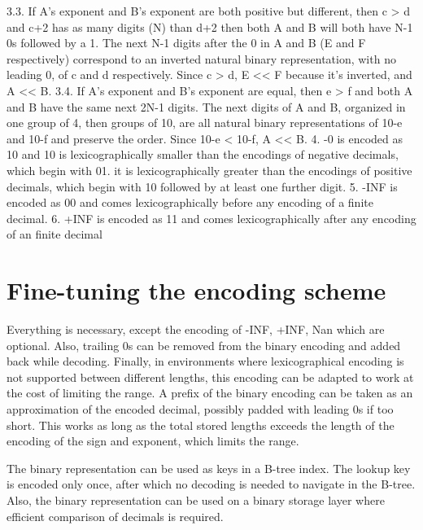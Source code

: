 \documentclass{acm_proc_article-sp}
\begin{document}
  3.3. If A's exponent and B's exponent are both positive but different, then c > d and c+2 has as many digits (N) than d+2 then both A and B will both have N-1 0s followed by a 1. The next N-1 digits after the 0 in A and B (E and F respectively) correspond to an inverted natural binary representation, with no leading 0, of c and d respectively. Since c > d, E << F because it's inverted, and A << B.
  3.4. If A's exponent and B's exponent are equal, then e > f and both A and B have the same next 2N-1 digits. The next digits of A and B, organized in one group of 4, then groups of 10, are all natural binary representations of 10-e and 10-f and preserve the order. Since 10-e < 10-f, A << B.
4. -0 is encoded as 10 and 10 is lexicographically smaller than the encodings of negative decimals, which begin with 01. it is lexicographically greater than the encodings of positive decimals, which begin with 10 followed by at least one further digit.
5. -INF is encoded as 00 and comes lexicographically before any encoding of a finite decimal.
6. +INF is encoded as 11 and comes lexicographically after any encoding of an finite decimal

\section{Fine-tuning the encoding scheme}

Everything is necessary, except the encoding of -INF, +INF, Nan which are optional. Also, trailing 0s can be removed from the binary encoding and added back while decoding. Finally, in environments where lexicographical encoding is not supported between different lengths, this encoding can be adapted to work at the cost of limiting the range.
A prefix of the binary encoding can be taken as an approximation of the encoded decimal, possibly padded with leading 0s if too short. This works as long as the total stored lengths exceeds the length of the encoding of the sign and exponent, which limits the range.

The binary representation can be used as keys in a B-tree index. The lookup key is encoded only once, after which no decoding is needed to navigate in the B-tree.
Also, the binary representation can be used on a binary storage layer where efficient comparison of decimals is required.
\end{document}
